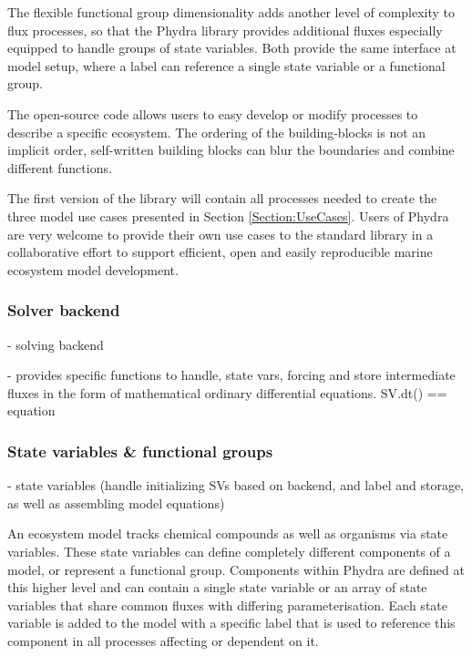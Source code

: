 \documentclass[journal abbreviations, manuscript]{copernicus}
\begin{document}
The flexible functional group dimensionality adds another level of complexity to flux processes, so that the Phydra library provides additional fluxes especially equipped to handle groups of state variables. Both provide the same interface at model setup, where a label can reference a single state variable or a functional group.

The open-source code allows users to easy develop or modify processes to describe a specific ecosystem. The ordering of the building-blocks is not an implicit order, self-written building blocks can blur the boundaries and combine different functions.

The first version of the library will contain all processes needed to create the three model use cases presented in Section \ref{Section:UseCases}. Users of Phydra are very welcome to provide their own use cases to the standard library in a collaborative effort to support efficient, open and easily reproducible marine ecosystem model development.


\subsubsection{Solver backend} \label{Section:SolverBackend}

- solving backend

- provides specific functions to handle, state vars, forcing and store intermediate fluxes in the form of mathematical ordinary differential equations. SV.dt() == equation


\subsubsection{State variables \& functional groups} \label{Section:StateVariables}

- state variables (handle initializing SVs based on backend, and label and storage, as well as assembling model equations)

An ecosystem model tracks chemical compounds as well as organisms via state variables. These state variables can define completely different components of a model, or represent a functional group. Components within Phydra are defined at this higher level and can contain a single state variable or an array of state variables that share common fluxes with differing parameterisation. Each state variable is added to the model with a specific label that is used to reference this component in all processes affecting or dependent on it. 
\end{document}
